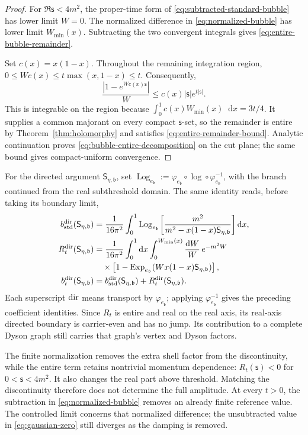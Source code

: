 \documentclass[final,5p,times,twocolumn,numbers,nopreprintline]{elsarticle}
\numberwithin{equation}{section}
\theoremstyle{definition}
\theoremstyle{remark}
\newcommand{\dd}{\mathop{}\!\mathrm d}
\newcommand{\bb}{\mathfrak b}
\newcommand{\ee}{e_{\bb}}
\newcommand{\embed}{\varphi_{\ee}}
\newcommand{\ExpDir}{\operatorname{Exp}_{\ee}}
\newcommand{\LogDir}{\operatorname{Log}_{\ee}}
\newcommand{\sMand}{\mathsf{s}}
\begin{document}
\begin{proof}
For \(\Re\sMand<4m^2\), the proper-time form of
\eqref{eq:subtracted-standard-bubble} has lower limit \(W=0\).
The normalized difference in \eqref{eq:normalized-bubble} has lower
limit \(W_{\min}(x)\). Subtracting the two convergent integrals
gives \eqref{eq:entire-bubble-remainder}.

Set \(c(x)=x(1-x)\). Throughout the remaining integration region,
\(0\leq Wc(x)\leq t\max(x,1-x)\leq t\). Consequently,
\[
 \frac{|1-e^{Wc(x)\sMand}|}{W}
       \leq c(x)|\sMand|e^{t|\sMand|}.
\]
This is integrable on the region because
\(\int_0^1c(x)W_{\min}(x)\dd x=3t/4\).
It supplies a common majorant on every compact \(\sMand\)-set,
so the remainder is entire by Theorem~\ref{thm:holomorphy} and
satisfies \eqref{eq:entire-remainder-bound}.
Analytic continuation proves \eqref{eq:bubble-entire-decomposition}
on the cut plane; the same bound gives compact-uniform convergence.
\end{proof}

For the directed argument \(\mathsf S_{\eta,\bb}\), set
\(\LogDir:=\embed\circ\log\circ\embed^{-1}\), with the
branch continued from the real subthreshold domain. The same
identity reads, before taking its boundary limit,
\begin{align}
 b_{\rm std}^{\rm dir}(\mathsf S_{\eta,\bb})
 &=\frac1{16\pi^2}\int_0^1
    \LogDir\!\left[
       \frac{m^2}{m^2-x(1-x)\mathsf S_{\eta,\bb}}
             \right]\dd x,\nonumber\\
 R_t^{\rm dir}(\mathsf S_{\eta,\bb})
 &=\frac1{16\pi^2}\int_0^1\dd x
       \int_0^{W_{\min}(x)}\frac{\dd W}{W}\,e^{-m^2W}\nonumber\\
 &\quad\times\left[1-\ExpDir\!\left(
          Wx(1-x)\mathsf S_{\eta,\bb}\right)\right],
           \nonumber\\
 b_t^{\rm dir}(\mathsf S_{\eta,\bb})
 &=b_{\rm std}^{\rm dir}(\mathsf S_{\eta,\bb})
                         +R_t^{\rm dir}(\mathsf S_{\eta,\bb}).
 \label{eq:normalized-bubble-directed-transport}
\end{align}
Each superscript \({\rm dir}\) means transport by \(\embed\);
applying \(\embed^{-1}\) gives the preceding coefficient
identities. Since \(R_t\) is entire and real on the real axis,
its real-axis directed boundary is carrier-even and has no jump.
Its contribution to a complete Dyson graph still carries that
graph's vertex and Dyson factors.

The finite normalization removes the extra shell factor from the
discontinuity, while the entire term retains nontrivial momentum
dependence: \(R_t(\sMand)<0\) for \(0<\sMand<4m^2\).
It also changes the real part above threshold. Matching the
discontinuity therefore does not determine the full amplitude.
At every \(t>0\), the subtraction in
\eqref{eq:normalized-bubble} removes an already finite reference
value. The controlled limit concerns that normalized difference;
the unsubtracted value in \eqref{eq:gaussian-zero} still diverges
as the damping is removed.
\end{document}
